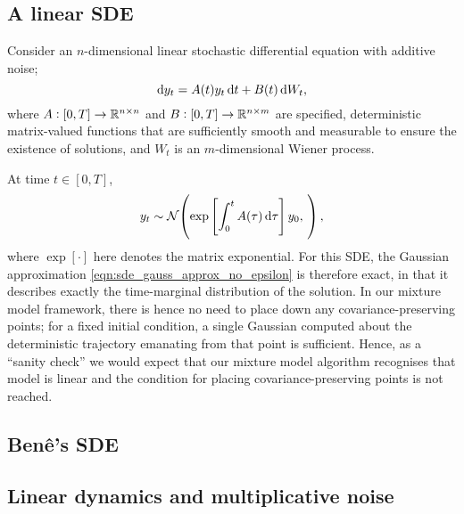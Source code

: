 \subsection{A linear SDE}
Consider an \(n\)-dimensional linear stochastic differential equation with additive noise;
\begin{equation}
	\sde{y_t}{A(t)y_t}{B(t)},
	\label{eqn:linear_n_sde}
\end{equation}
where \(A: [0,T] \to \mathbb{R}^{n\times n}\) and \(B: [0,T] \to \mathbb{R}^{n \times m}\) are specified, deterministic matrix-valued functions that are sufficiently smooth and measurable to ensure the existence of solutions, and \(W_t\) is an \(m\)-dimensional Wiener process.

At time \(t \in [0,T]\),
\[
	y_t \isGauss{\exp\left[\int_0^{t}{A(\tau)\dif \tau}\right]y_0, \, },
\]
where \(\exp\left[\cdot\right]\) here denotes the matrix exponential.
For this SDE, the Gaussian approximation \eqref{eqn:sde_gauss_approx_no_epsilon} is therefore exact, in that it describes exactly the time-marginal distribution of the solution.
In our mixture model framework, there is hence no need to place down any covariance-preserving points; for a fixed initial condition, a single Gaussian computed about the deterministic trajectory emanating from that point is sufficient.
Hence, as a ``sanity check'' we would expect that our mixture model algorithm recognises that model is linear and the condition for placing covariance-preserving points is not reached.





\subsection{Ben\^e's SDE}


\subsection{Linear dynamics and multiplicative noise}




